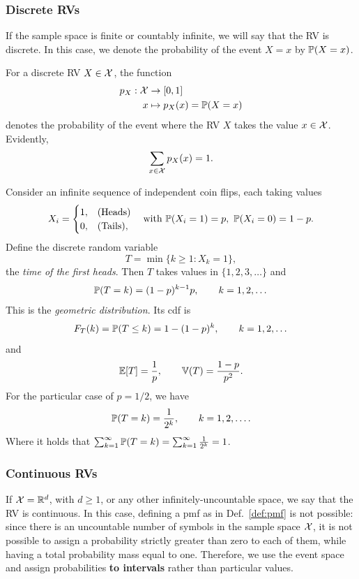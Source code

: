 \subsubsection{Discrete RVs}
\label{cap:prob_disc_RV}

If the sample space is finite or countably infinite, we will say that the RV is discrete. In this case, we denote the probability of the event $X=x$ by $\mathbb{P}(X=x)$. 

\begin{definition} 
\label{def:pmf}
For a discrete RV $X\in{\mathcal X}$, the function 
\begin{align}
 	p_X: {\mathcal X} &\to [0,1]\\
 	x &\mapsto p_X(x)=\mathbb{P}(X=x)
 \end{align} 
denotes the probability of the event where the RV $X$ takes the value $x\in{\mathcal X}$. Evidently, 
\begin{equation}
	\sum_{x\in{\mathcal X}} p_X(x) = 1.
\end{equation}
\end{definition}

\begin{example}


Consider an infinite sequence of independent coin flips, each taking values
\[
X_i = 
\begin{cases}
	1, & \text{(Heads)} \\
	0, & \text{(Tails)},
\end{cases}
\quad\text{with } \mathbb{P}(X_i=1)=p, \ \mathbb{P}(X_i=0)=1-p.
\]
Define the discrete random variable
\[
T = \min\{k \ge 1 : X_k = 1\},
\]
the \emph{time of the first heads}. Then $T$ takes values in $\{1,2,3,\dots\}$ and
\[
\mathbb{P}(T=k)
= (1-p)^{k-1}p, \qquad k=1,2,\dots
\]
This is the \emph{geometric distribution}. Its cdf is
\[
F_T(k)
= \mathbb{P}(T \le k)
= 1-(1-p)^{k}, \qquad k=1,2,\dots
\]
and
\[
\operatorname{\mathbb{E}}[T] = \frac{1}{p}, 
\qquad 
\operatorname{\mathbb{V}}(T) = \frac{1-p}{p^{2}}.
\]
For the particular case of $p=1/2$, we have 
\[
\mathbb{P}(T=k)
= \frac{1}{2^k}, \qquad k=1,2,\dots.
\]
Where it holds that $\sum_{k=1}^\infty \mathbb{P}(T=k) = \sum_{k=1}^\infty \frac{1}{2^k} = 1$.

\end{example}

\subsubsection{Continuous RVs}
\label{cap:prob_cont_RV}

If ${\mathcal X} = \mathbb{R}^d$, with $d\geq1$, or any other infinitely-uncountable space, we say that the RV is continuous. In this case, defining a pmf as in Def.~\ref{def:pmf} is not possible: since there is an uncountable number of symbols in the sample space ${\mathcal X}$, it is not possible to assign a probability strictly greater than zero to each of them, while having a total probability mass equal to one. Therefore, we use the event space and assign probabilities \textbf{to intervals} rather than particular values. 

